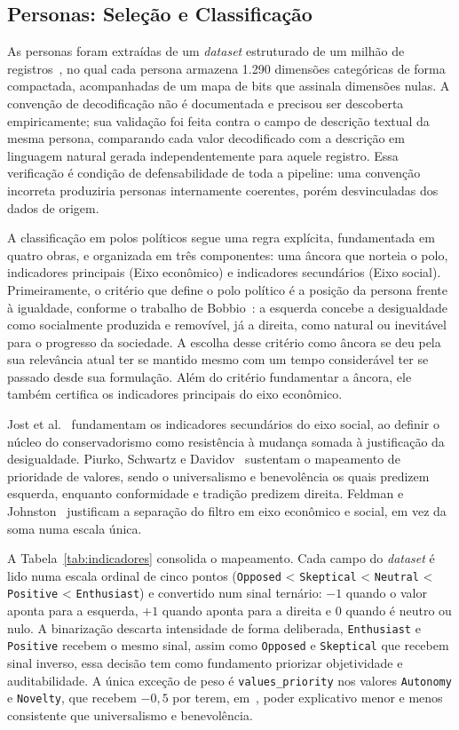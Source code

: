 \documentclass[conference]{IEEEtran} \IEEEoverridecommandlockouts %
\begin{document}
\subsection{Personas: Seleção e Classificação}

As personas foram extraídas de um \textit{dataset} estruturado de um milhão de
registros~\cite{li2026matraix}, no qual cada persona armazena 1.290 dimensões
categóricas de forma compactada, acompanhadas de um mapa de bits que assinala
dimensões nulas. A convenção de decodificação não é documentada e precisou ser
descoberta empiricamente; sua validação foi feita contra o campo de descrição
textual da mesma persona, comparando cada valor decodificado com a descrição
em linguagem natural gerada independentemente para aquele registro. Essa
verificação é condição de defensabilidade de toda a pipeline: uma convenção
incorreta produziria personas internamente coerentes, porém desvinculadas dos
dados de origem.

A classificação em polos políticos segue uma regra explícita, fundamentada em
quatro obras, e organizada em três componentes: uma âncora que norteia o polo, indicadores
principais (Eixo econômico) e indicadores secundários (Eixo social). Primeiramente, o critério que define o polo político é a posição da persona frente à igualdade, conforme o trabalho de Bobbio~\cite{bobbio1995direita}: a esquerda concebe a desigualdade como socialmente produzida e removível, já a direita, como natural ou inevitável para o progresso da sociedade. A escolha desse critério como âncora se deu pela sua relevância atual ter se mantido mesmo com um tempo considerável ter se passado desde sua formulação. Além do critério fundamentar a âncora, ele também certifica os indicadores principais do eixo econômico. 

Jost et al.~\cite{jost2003political} fundamentam os indicadores
secundários do eixo social, ao definir o núcleo do conservadorismo como
resistência à mudança somada à justificação da desigualdade. Piurko, Schwartz e
Davidov~\cite{piurko2011basic} sustentam o mapeamento de prioridade de valores, sendo o 
universalismo e benevolência os quais predizem esquerda, enquanto conformidade e tradição
predizem direita. Feldman e Johnston~\cite{feldman2014understanding} justificam
a separação do filtro em eixo econômico e social, em vez da soma numa escala única.

A Tabela~\ref{tab:indicadores} consolida o mapeamento. Cada campo do
\textit{dataset} é lido numa escala ordinal de cinco pontos
(\texttt{Opposed} < \texttt{Skeptical} < \texttt{Neutral} < \texttt{Positive} <
\texttt{Enthusiast}) e convertido num sinal ternário: $-1$ quando o valor
aponta para a esquerda, $+1$ quando aponta para a direita e $0$ quando é
neutro ou nulo. A binarização descarta intensidade de forma deliberada,
\texttt{Enthusiast} e \texttt{Positive} recebem o mesmo sinal, assim como \texttt{Opposed} e \texttt{Skeptical} que recebem sinal inverso, essa decisão tem como fundamento priorizar  objetividade e auditabilidade. A única exceção de peso é
\texttt{values\_priority} nos valores \texttt{Autonomy} e \texttt{Novelty},
que recebem $-0,5$ por terem, em~\cite{piurko2011basic}, poder explicativo
menor e menos consistente que universalismo e benevolência.
\end{document}
